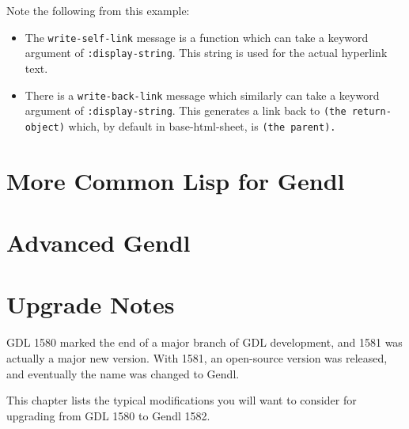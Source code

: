 \documentclass [11pt]{book}
\begin{document}
 Note the following from this example:

\begin{itemize}

\item The \texttt{write-self-link} message is a function which can take a keyword argument
   of \texttt{:display-string}. This string is used for the actual hyperlink text.

\item There is a \texttt{write-back-link} message which similarly can take a keyword argument of \texttt{:display-string}. This generates a link back to \texttt{(the return-object)} which, by default in base-html-sheet, is \texttt{(the parent).}

\end{itemize}





\chapter{More Common Lisp for Gendl}

\label{chap:morecommonlispforgendl}



\chapter{Advanced Gendl}

\label{chap:advancedgendl}



\chapter*{Upgrade Notes}

\label{chap:upgradenotes}

GDL 1580 marked the end of a major branch of GDL development,
and 1581 was actually a major new version. With 1581, an open-source
version was released, and eventually the name was changed to
Gendl. 

This chapter lists the typical modifications you will want to consider
for upgrading from GDL 1580 to Gendl 1582.
\end{document}
